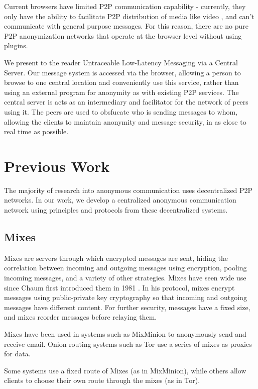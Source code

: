 \documentclass[twocolumn,11pt,english]{article}
\begin{document}
Current browsers have limited P2P communication capability - currently, they only have the ability to facilitate P2P distribution of media like video \cite{daoust2012towards}, and can't communicate with general purpose messages. For this reason, there are no pure P2P anonymization networks that operate at the browser level without using plugins. 

We present to the reader Untraceable Low-Latency Messaging via a Central Server. Our message system is accessed via the browser, allowing a person to browse to one central location and conveniently use this service, rather than using an external program for anonymity as with existing P2P services. The central server is acts as an intermediary and facilitator for the network of peers using it. The peers are used to obsfucate who is sending messages to whom, allowing the clients to maintain anonymity and message security, in as close to real time as possible.

\section{Previous Work}
The majority of research into anonymous communication uses decentralized P2P networks. In our work, we develop a centralized anonymous communication network using principles and protocols from these decentralized systems. 

\subsection{Mixes}
Mixes are servers through which encrypted messages are sent, hiding the correlation between incoming and outgoing messages using encryption, pooling incoming messages, and a variety of other strategies\cite{chaum-mix}. Mixes have seen wide use since Chaum first introduced them in 1981 \cite{chaum-mix}. In his protocol, mixes encrypt messages using public-private key cryptography so that incoming and outgoing messages have different content. For further security, messages have a fixed size, and mixes reorder messages before relaying them. 

 Mixes have been used in systems such as MixMinion\cite{minion-design} to anonymously send and receive email. Onion routing systems such as Tor \cite{tor-design} use a series of mixes as proxies for data. 

Some systems use a fixed route of Mixes (as in MixMinion), while others allow clients to choose their own route through the mixes (as in Tor).
\end{document}
